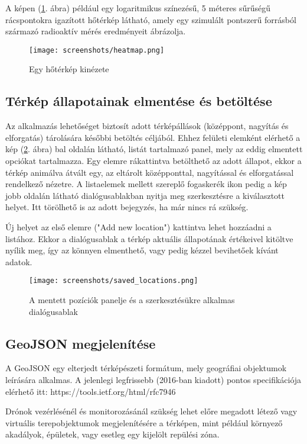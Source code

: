 A képen (\ref{fig:heatmap}. ábra) például egy logaritmikus színezésű, 5 méteres
sűrűségű rácspontokra igazított hőtérkép látható, amely egy szimulált pontszerű
forrásból származó radioaktív mérés eredményeit ábrázolja.

\begin{figure}[H]
  \texttt{[image: screenshots/heatmap.png]}
  \caption{Egy hőtérkép kinézete}
  \label{fig:heatmap}
\end{figure}


\subsection{Térkép állapotainak elmentése és betöltése}

Az alkalmazás lehetőséget biztosít adott térképállások (középpont, nagyítás és
elforgatás) tárolására későbbi betöltés céljából. Ehhez felületi elemként
elérhető a kép (\ref{fig:saved_locations}. ábra) bal oldalán látható, listát
tartalmazó panel, mely az eddig elmentett opciókat tartalmazza. Egy elemre
rákattintva betölthető az adott állapot, ekkor a térkép animálva átvált egy,
az eltárolt középponttal, nagyítással és elforgatással rendelkező nézetre. A
listaelemek mellett szereplő fogaskerék ikon pedig a kép jobb oldalán látható
dialógusablakban nyitja meg szerkesztésre a kiválasztott helyet. Itt törölhető
is az adott bejegyzés, ha már nincs rá szükség.

Új helyet az első elemre ("Add new location") kattintva lehet hozzáadni a
listához. Ekkor a dialógusablak a térkép aktuális állapotának értékeivel
kitöltve nyílik meg, így az könnyen elmenthető, vagy pedig kézzel bevihetőek
kívánt adatok.

\begin{figure}[H]
  \texttt{[image: screenshots/saved\_locations.png]}
  \caption{A mentett pozíciók panelje és a szerkesztésükre alkalmas dialógusablak}
  \label{fig:saved_locations}
\end{figure}


\subsection{GeoJSON megjelenítése}

A GeoJSON egy elterjedt térképészeti formátum, mely geográfiai objektumok
leírására alkalmas. A jelenlegi legfrissebb (2016-ban kiadott) pontos
specifikációja elérhető itt: https://tools.ietf.org/html/rfc7946

Drónok vezérlésénél és monitorozásánál szükség lehet előre megadott létező vagy
virtuális terepobjektumok megjelenítésére a térképen, mint például környező
akadályok, épületek, vagy esetleg egy kijelölt repülési zóna.

